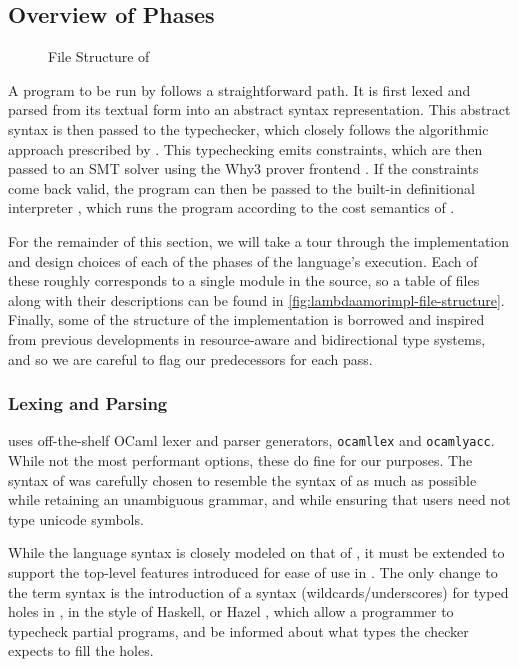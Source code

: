 \subsection{Overview of Phases}
\begin{figure}

\caption{File Structure of \lambdaamorimpl}
\label{fig:lambdaamorimpl-file-structure}
\end{figure}
A program to be run by \lambdaamorimpl follows a straightforward path. It is first lexed and parsed from its textual form into an abstract syntax representation. This abstract syntax is then passed to the typechecker, which closely follows the algorithmic approach prescribed by \bilambdaamor. This typechecking emits constraints, which are then passed to an SMT solver using the Why3 prover frontend \cite{boogie11why3}. If the constraints come back valid, the program can then be passed to the built-in definitional interpreter \cite{reynolds:acm72}, which runs the program according to the cost semantics of \citet{rajani-et-al:popl21}.

For the remainder of this section, we will take a tour through the implementation and design choices of each of the phases of the language's execution. Each of these roughly corresponds to a single module in the \lambdaamorimpl source, so a table of files along with their descriptions can be found in \autoref{fig:lambdaamorimpl-file-structure}. Finally, some of the structure of the implementation is borrowed and inspired from previous developments in resource-aware and bidirectional type systems, and so we are careful to flag our predecessors for each pass.


\subsubsection{Lexing and Parsing}
\lambdaamorimpl uses off-the-shelf OCaml lexer and parser generators, \texttt{ocamllex} and \texttt{ocamlyacc}. While not the most performant options, these do fine for our purposes. The syntax of \lambdaamorimpl was carefully chosen to resemble the syntax of \bilambdaamor as much as possible while retaining an unambiguous grammar, and while ensuring that users need not type unicode symbols.

While the language syntax is closely modeled on that of \bilambdaamor, it must be extended to support the top-level features introduced for ease of use in \lambdaamorimpl. The only change to the term syntax is the introduction of a syntax (wildcards/underscores) for typed holes in \lambdaamorimpl, in the style of Haskell, or Hazel \cite{omar-et-al:popl17}, which allow a programmer to typecheck partial programs, and be informed about what types the checker expects to fill the holes.

